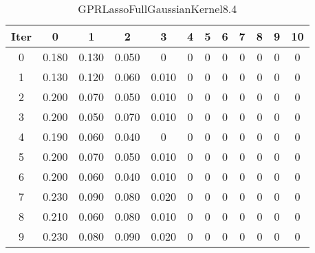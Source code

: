\begin{table}
	\begin{center}
		\begin{tabular}{|c|c|c|c|c|c|c|c|c|c|c|c|}
			\hline
			Iter & 0 & 1 & 2 & 3 & 4 & 5 & 6 & 7 & 8 & 9 & 10 \\
			\hline
			0 & 0.180 & 0.130 & 0.050 & 0 & 0 & 0 & 0 & 0 & 0 & 0 & 0 \\
			\hline
			1 & 0.130 & 0.120 & 0.060 & 0.010 & 0 & 0 & 0 & 0 & 0 & 0 & 0 \\
			\hline
			2 & 0.200 & 0.070 & 0.050 & 0.010 & 0 & 0 & 0 & 0 & 0 & 0 & 0 \\
			\hline
			3 & 0.200 & 0.050 & 0.070 & 0.010 & 0 & 0 & 0 & 0 & 0 & 0 & 0 \\
			\hline
			4 & 0.190 & 0.060 & 0.040 & 0 & 0 & 0 & 0 & 0 & 0 & 0 & 0 \\
			\hline
			5 & 0.200 & 0.070 & 0.050 & 0.010 & 0 & 0 & 0 & 0 & 0 & 0 & 0 \\
			\hline
			6 & 0.200 & 0.060 & 0.040 & 0.010 & 0 & 0 & 0 & 0 & 0 & 0 & 0 \\
			\hline
			7 & 0.230 & 0.090 & 0.080 & 0.020 & 0 & 0 & 0 & 0 & 0 & 0 & 0 \\
			\hline
			8 & 0.210 & 0.060 & 0.080 & 0.010 & 0 & 0 & 0 & 0 & 0 & 0 & 0 \\
			\hline
			9 & 0.230 & 0.080 & 0.090 & 0.020 & 0 & 0 & 0 & 0 & 0 & 0 & 0 \\
			\hline
		\end{tabular}
	\end{center}
	\caption{GPRLassoFullGaussianKernel8.4}
\end{table}